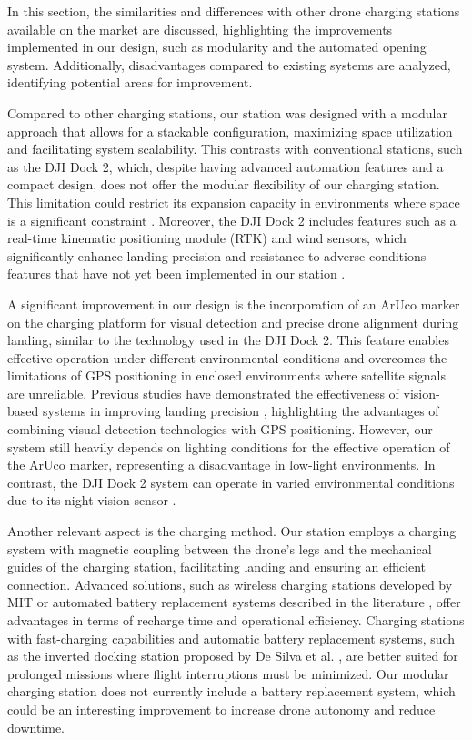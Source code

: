 
In this section, the similarities and differences with other drone charging stations available on the market are discussed, highlighting the improvements implemented in our design, such as modularity and the automated opening system. Additionally, disadvantages compared to existing systems are analyzed, identifying potential areas for improvement.

Compared to other charging stations, our station was designed with a modular approach that allows for a stackable configuration, maximizing space utilization and facilitating system scalability. This contrasts with conventional stations, such as the DJI Dock 2, which, despite having advanced automation features and a compact design, does not offer the modular flexibility of our charging station. This limitation could restrict its expansion capacity in environments where space is a significant constraint \cite{bene2023}. Moreover, the DJI Dock 2 includes features such as a real-time kinematic positioning module (RTK) and wind sensors, which significantly enhance landing precision and resistance to adverse conditions—features that have not yet been implemented in our station \cite{nieuwoudt2023}.

A significant improvement in our design is the incorporation of an ArUco marker on the charging platform for visual detection and precise drone alignment during landing, similar to the technology used in the DJI Dock 2. This feature enables effective operation under different environmental conditions and overcomes the limitations of GPS positioning in enclosed environments where satellite signals are unreliable. Previous studies have demonstrated the effectiveness of vision-based systems in improving landing precision \cite{jiang2019}, highlighting the advantages of combining visual detection technologies with GPS positioning. However, our system still heavily depends on lighting conditions for the effective operation of the ArUco marker, representing a disadvantage in low-light environments. In contrast, the DJI Dock 2 system can operate in varied environmental conditions due to its night vision sensor \cite{nieuwoudt2023}.

Another relevant aspect is the charging method. Our station employs a charging system with magnetic coupling between the drone's legs and the mechanical guides of the charging station, facilitating landing and ensuring an efficient connection. Advanced solutions, such as wireless charging stations developed by MIT \cite{jiang2019} or automated battery replacement systems described in the literature \cite{grlj_docking_stations, desilva2022}, offer advantages in terms of recharge time and operational efficiency. Charging stations with fast-charging capabilities and automatic battery replacement systems, such as the inverted docking station proposed by De Silva et al. \cite{desilva2023}, are better suited for prolonged missions where flight interruptions must be minimized. Our modular charging station does not currently include a battery replacement system, which could be an interesting improvement to increase drone autonomy and reduce downtime.

